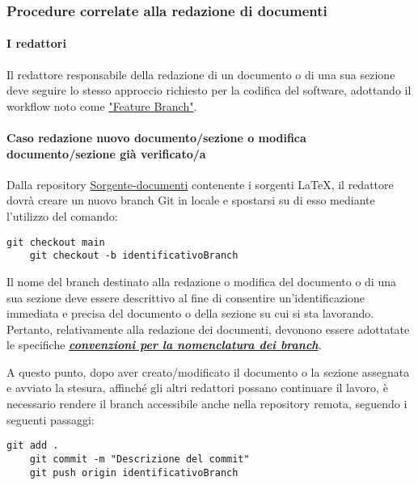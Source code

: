 \subsubsection{Procedure correlate alla redazione di documenti}

\paragraph{I redattori}
Il redattore responsabile della redazione di un documento o di una sua sezione deve seguire lo stesso approccio richiesto per la codifica del software, adottando il workflow noto come \href{https://www.atlassian.com/git/tutorials/comparing-workflows/feature-branch-workflow}{"Feature Branch"}. \\

\vspace{0.1cm}

\paragraph*{\textbf{Caso redazione nuovo documento/sezione o modifica documento/sezione già verificato/a}}
Dalla repository \href{https://github.com/ByteOps-swe/Sorgente-documenti}{Sorgente-documenti} contenente i sorgenti \LaTeX, il redattore dovrà creare un nuovo branch Git in locale e spostarsi su di esso mediante l'utilizzo del comando:
\begin{lstlisting}[style=code]
    git checkout main
    git checkout -b identificativoBranch
\end{lstlisting}

Il nome del branch destinato alla redazione o modifica del documento o di una sua sezione deve essere descrittivo al fine di consentire un'identificazione immediata e precisa del documento o della sezione su cui si sta lavorando. Pertanto, relativamente alla redazione dei documenti, devonono essere adottatate le specifiche \hyperlink{par:convezioninomenclaturabranchdocumenti}{\textit{\textbf{convenzioni per la nomenclatura dei branch}}}.

A questo punto, dopo aver creato/modificato il documento o la sezione assegnata e avviato la stesura, affinché gli altri redattori possano continuare il lavoro, è necessario rendere il branch accessibile anche nella repository remota, seguendo i seguenti passaggi:
\begin{lstlisting}[style=code]
    git add .
    git commit -m "Descrizione del commit"
    git push origin identificativoBranch
\end{lstlisting}


